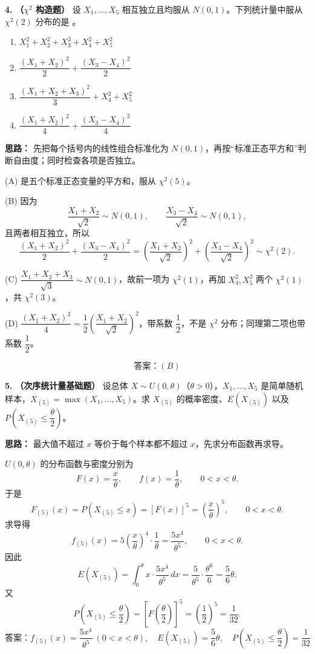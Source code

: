 \textbf{4.} \textbf{（$\chi^2$ 构造题）} 设 $X_1,\ldots,X_5$ 相互独立且均服从 $N(0,1)$。下列统计量中服从 $\chi^2(2)$ 分布的是 \underline{\qquad}。
\begin{enumerate}[label=(\Alph*)]
    \item $X_1^2+X_2^2+X_3^2+X_4^2+X_5^2$
    \item $\dfrac{(X_1+X_2)^2}{2}+\dfrac{(X_3-X_4)^2}{2}$
    \item $\dfrac{(X_1+X_2+X_3)^2}{3}+X_4^2+X_5^2$
    \item $\dfrac{(X_1+X_2)^2}{4}+\dfrac{(X_3-X_4)^2}{4}$
\end{enumerate}

\ifshowsolutions%
\textbf{思路：} 先把每个括号内的线性组合标准化为 $N(0,1)$，再按“标准正态平方和”判断自由度；同时检查各项是否独立。

(A) 是五个标准正态变量的平方和，服从 $\chi^2(5)$。

(B) 因为
\[
\frac{X_1+X_2}{\sqrt2}\sim N(0,1),\qquad
\frac{X_3-X_4}{\sqrt2}\sim N(0,1),
\]
且两者相互独立，所以
\[
\frac{(X_1+X_2)^2}{2}+\frac{(X_3-X_4)^2}{2}
=\left(\frac{X_1+X_2}{\sqrt2}\right)^2
+\left(\frac{X_3-X_4}{\sqrt2}\right)^2
\sim\chi^2(2).
\]

(C) $\dfrac{X_1+X_2+X_3}{\sqrt3}\sim N(0,1)$，故前一项为 $\chi^2(1)$，再加 $X_4^2,X_5^2$ 两个 $\chi^2(1)$，共 $\chi^2(3)$。

(D) $\dfrac{(X_1+X_2)^2}{4}=\dfrac12\left(\dfrac{X_1+X_2}{\sqrt2}\right)^2$，带系数 $\dfrac12$，不是 $\chi^2$ 分布；同理第二项也带系数 $\dfrac12$。

\[
\boxed{\text{答案：}(B)}
\]
\else \answerarea \fi%

\textbf{5.} \textbf{（次序统计量基础题）} 设总体 $X\sim U(0,\theta)$（$\theta>0$），$X_1,\ldots,X_5$ 是简单随机样本，$X_{(5)}=\max(X_1,\ldots,X_5)$。求 $X_{(5)}$ 的概率密度、$E(X_{(5)})$ 以及 $P\!\left(X_{(5)}\leq \dfrac{\theta}{2}\right)$。

\ifshowsolutions%
\textbf{思路：} 最大值不超过 $x$ 等价于每个样本都不超过 $x$，先求分布函数再求导。

$U(0,\theta)$ 的分布函数与密度分别为
\[
F(x)=\frac{x}{\theta},\qquad f(x)=\frac{1}{\theta},\qquad 0<x<\theta.
\]
于是
\[
F_{(5)}(x)=P(X_{(5)}\leq x)=[F(x)]^5=\left(\frac{x}{\theta}\right)^5,\qquad 0<x<\theta.
\]
求导得
\[
f_{(5)}(x)=5\left(\frac{x}{\theta}\right)^4\cdot\frac{1}{\theta}
=\frac{5x^4}{\theta^5},\qquad 0<x<\theta.
\]
因此
\[
E(X_{(5)})=\int_0^\theta x\cdot\frac{5x^4}{\theta^5}\,dx
=\frac{5}{\theta^5}\cdot\frac{\theta^6}{6}
=\frac56\theta.
\]
又
\[
P\!\left(X_{(5)}\leq\frac{\theta}{2}\right)
=\left[F\!\left(\frac{\theta}{2}\right)\right]^5
=\left(\frac12\right)^5=\frac{1}{32}.
\]
\[
\boxed{\text{答案：}f_{(5)}(x)=\frac{5x^4}{\theta^5}\ (0<x<\theta),\quad E(X_{(5)})=\frac56\theta,\quad P\!\left(X_{(5)}\leq\frac{\theta}{2}\right)=\frac{1}{32}}
\]
\else \answerarea \fi%

